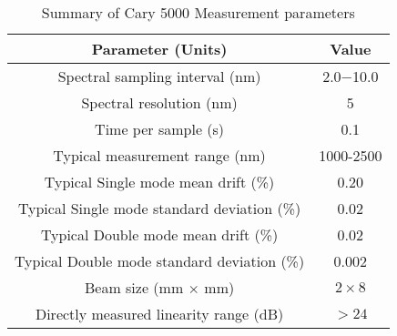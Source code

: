 \begin{table}[h!]
\caption{Summary of Cary 5000 Measurement parameters \label{tabCary5000pars}}
\begin{center}
\begin{tabular}{ c c }
\hline
        Parameter (Units) & Value \\ 
\hline
        Spectral sampling interval (nm) & 2.0$-$10.0 \\
        Spectral resolution (nm) & 5 \\
        Time per sample (s) & 0.1 \\
        Typical measurement range (nm) & 1000-2500 \\
		Typical Single mode mean drift (\%) & 0.20 \\
		Typical Single mode standard deviation (\%) & 0.02 \\
        Typical Double mode mean drift (\%) & 0.02 \\
        Typical Double mode standard deviation (\%) & 0.002 \\        
 		Beam size (mm $\times$ mm) & $2 \times 8$ \\
        Directly measured linearity range (dB) & $>24$ \\
    \hline
    \end{tabular}
\end{center}
\end{table}